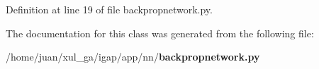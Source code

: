 \subsubsection{}\label{classapp_1_1nn_1_1backpropnetwork_1_1BackPropNetwork_ad00e11259f6132ebe6954084c8c745b}




Definition at line 19 of file backpropnetwork.py.

The documentation for this class was generated from the following file:\begin{CompactItemize}
\item 
/home/juan/xul\_\-ga/igap/app/nn/{\bf backpropnetwork.py}\end{CompactItemize}
